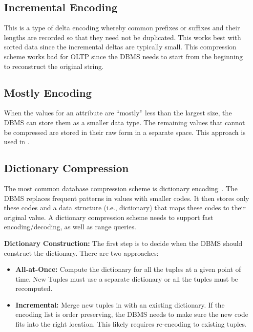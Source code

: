 \documentclass[11pt]{article}
\begin{document}
\subsection*{Incremental Encoding}
This is a type of delta encoding whereby common prefixes or suffixes and their lengths are recorded so that they need not be duplicated. This works best with sorted data since the incremental deltas are typically small. This compression scheme works bad for OLTP since the DBMS needs to start from the beginning to reconstruct the original string.

\subsection*{Mostly Encoding}
When the values for an attribute are ``mostly'' less than the largest size, the DBMS can store them as a smaller data type. The remaining values that cannot be compressed are stored in their raw form in a separate space. This approach is used in .

\subsection*{Dictionary Compression}
The most common database compression scheme is dictionary encoding~\cite{p283-binnig}.
The DBMS replaces frequent patterns in values with smaller codes. It then stores only these codes and a data structure (i.e., dictionary) that maps these codes to their original value.
A dictionary compression scheme needs to support fast encoding/decoding, as well as range queries.

\textbf{Dictionary Construction:} The first step is to decide when the DBMS should construct the dictionary. There are two approaches:
\begin{itemize}
    \item \textbf{All-at-Once:} Compute the dictionary for all the tuples at a given point of time. New Tuples must use a separate dictionary or all the tuples must be recomputed.
    \item \textbf{Incremental:} Merge new tuples in with an existing dictionary. If the encoding list is order preserving, the DBMS needs to make sure the new code fits into the right location. This likely requires re-encoding to existing tuples. 
\end{itemize}
\end{document}
